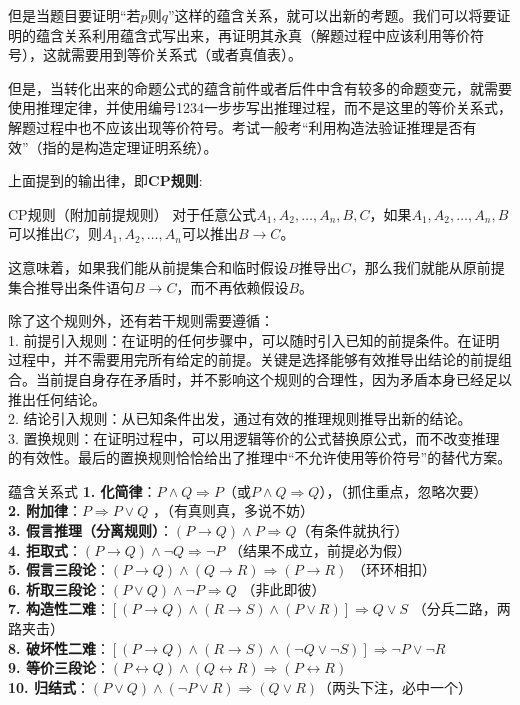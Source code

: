 \documentclass[lang=cn,11pt]{elegantbook}
\begin{document}
但是当题目要证明“若$p$则$q$”这样的蕴含关系，就可以出新的考题。我们可以将要证明的蕴含关系利用蕴含式写出来，再证明其永真（解题过程中应该利用等价符号），这就需要用到等价关系式（或者真值表）。

但是，当转化出来的命题公式的蕴含前件或者后件中含有较多的命题变元，就需要使用推理定律，并使用编号1234一步步写出推理过程，而不是这里的等价关系式，解题过程中也不应该出现等价符号。考试一般考“利用构造法验证推理是否有效”（指的是构造定理证明系统）。

上面提到的输出律，即\textbf{CP规则}:
\begin{theorem}{CP规则（附加前提规则）}
对于任意公式$A_1, A_2, \ldots, A_n, B, C$，如果$A_1, A_2, \ldots, A_n, B$可以推出$C$，则$A_1, A_2, \ldots, A_n$可以推出$B \rightarrow C$。

这意味着，如果我们能从前提集合和临时假设$B$推导出$C$，那么我们就能从原前提集合推导出条件语句$B \rightarrow C$，而不再依赖假设$B$。
\end{theorem}
除了这个规则外，还有若干规则需要遵循：\\
1. 前提引入规则：在证明的任何步骤中，可以随时引入已知的前提条件。在证明过程中，并不需要用完所有给定的前提。关键是选择能够有效推导出结论的前提组合。当前提自身存在矛盾时，并不影响这个规则的合理性，因为矛盾本身已经足以推出任何结论。\\
2. 结论引入规则：从已知条件出发，通过有效的推理规则推导出新的结论。\\
3. 置换规则：在证明过程中，可以用逻辑等价的公式替换原公式，而不改变推理的有效性。最后的置换规则恰恰给出了推理中“不允许使用等价符号”的替代方案。
\begin{theorem}{蕴含关系式}
\textbf{1. 化简律}：$P \land Q \Rightarrow P$（或$P \land Q \Rightarrow Q$），（抓住重点，忽略次要）\\
\textbf{2. 附加律}：$P \Rightarrow P \lor Q$ ，（有真则真，多说不妨）\\
\textbf{3. 假言推理（分离规则）}：$(P \rightarrow Q) \land P \Rightarrow Q$（有条件就执行） \\
\textbf{4. 拒取式}：$(P \rightarrow Q) \land \neg Q \Rightarrow \neg P$ （结果不成立，前提必为假）\\
\textbf{5. 假言三段论}：$(P \rightarrow Q) \land (Q \rightarrow R) \Rightarrow (P \rightarrow R)$ （环环相扣）\\
\textbf{6. 析取三段论}：$(P \lor Q) \land \neg P \Rightarrow Q$ （非此即彼）\\
\textbf{7. 构造性二难}：$[(P \rightarrow Q) \land (R \rightarrow S)\land(P \lor R)] \Rightarrow Q \lor S$ （分兵二路，两路夹击）\\
\textbf{8. 破坏性二难}：$[(P \rightarrow Q) \land (R \rightarrow S)\land(\neg Q \lor \neg S)] \Rightarrow \neg P \lor \neg R$ \\
\textbf{9. 等价三段论}：$(P \leftrightarrow Q) \land (Q \leftrightarrow R) \Rightarrow (P \leftrightarrow R)$ \\
\textbf{10. 归结式}：$(P \lor Q) \land (\neg P \lor R) \Rightarrow (Q \lor R)$（两头下注，必中一个）
\end{theorem}
\end{document}
